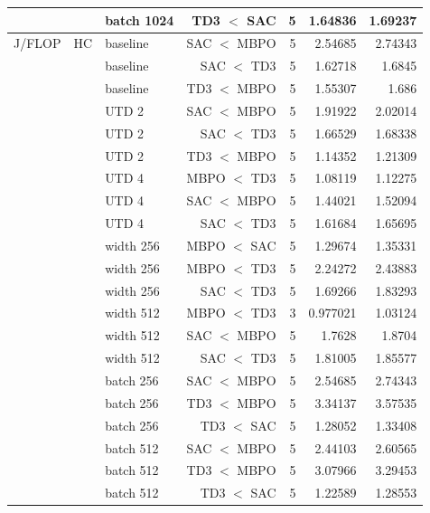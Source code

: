 {\begin{longtable}{@{}lllrrrr@{}}
     &  & batch 1024 & TD3 $<$ SAC & \num{5} & \num{1.64836} & \num{1.69237} \\
    \midrule
    J/FLOP & HC & baseline & SAC $<$ MBPO & \num{5} & \num{2.54685} & \num{2.74343} \\
     &  & baseline & SAC $<$ TD3 & \num{5} & \num{1.62718} & \num{1.6845} \\
     &  & baseline & TD3 $<$ MBPO & \num{5} & \num{1.55307} & \num{1.686} \\
     &  & UTD 2 & SAC $<$ MBPO & \num{5} & \num{1.91922} & \num{2.02014} \\
     &  & UTD 2 & SAC $<$ TD3 & \num{5} & \num{1.66529} & \num{1.68338} \\
     &  & UTD 2 & TD3 $<$ MBPO & \num{5} & \num{1.14352} & \num{1.21309} \\
     &  & UTD 4 & MBPO $<$ TD3 & \num{5} & \num{1.08119} & \num{1.12275} \\
     &  & UTD 4 & SAC $<$ MBPO & \num{5} & \num{1.44021} & \num{1.52094} \\
     &  & UTD 4 & SAC $<$ TD3 & \num{5} & \num{1.61684} & \num{1.65695} \\
     &  & width 256 & MBPO $<$ SAC & \num{5} & \num{1.29674} & \num{1.35331} \\
     &  & width 256 & MBPO $<$ TD3 & \num{5} & \num{2.24272} & \num{2.43883} \\
     &  & width 256 & SAC $<$ TD3 & \num{5} & \num{1.69266} & \num{1.83293} \\
     &  & width 512 & MBPO $<$ TD3 & \num{3} & \num{0.977021} & \num{1.03124} \\
     &  & width 512 & SAC $<$ MBPO & \num{5} & \num{1.7628} & \num{1.8704} \\
     &  & width 512 & SAC $<$ TD3 & \num{5} & \num{1.81005} & \num{1.85577} \\
     &  & batch 256 & SAC $<$ MBPO & \num{5} & \num{2.54685} & \num{2.74343} \\
     &  & batch 256 & TD3 $<$ MBPO & \num{5} & \num{3.34137} & \num{3.57535} \\
     &  & batch 256 & TD3 $<$ SAC & \num{5} & \num{1.28052} & \num{1.33408} \\
     &  & batch 512 & SAC $<$ MBPO & \num{5} & \num{2.44103} & \num{2.60565} \\
     &  & batch 512 & TD3 $<$ MBPO & \num{5} & \num{3.07966} & \num{3.29453} \\
     &  & batch 512 & TD3 $<$ SAC & \num{5} & \num{1.22589} & \num{1.28553} \\

\end{longtable}}
